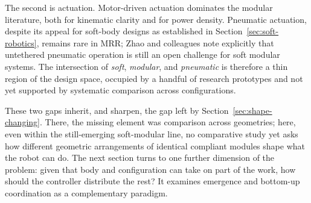 The second is actuation. Motor-driven actuation dominates the modular literature, both for kinematic clarity and for power density. Pneumatic actuation, despite its appeal for soft-body designs as established in Section~\ref{sec:soft-robotics}, remains rare in MRR; Zhao and colleagues note explicitly that untethered pneumatic operation is still an open challenge for soft modular systems. The intersection of \textit{soft}, \textit{modular}, and \textit{pneumatic} is therefore a thin region of the design space, occupied by a handful of research prototypes and not yet supported by systematic comparison across configurations.

These two gaps inherit, and sharpen, the gap left by Section~\ref{sec:shape-changing}. There, the missing element was comparison across geometries; here, even within the still-emerging soft-modular line, no comparative study yet asks how different geometric arrangements of identical compliant modules shape what the robot can do. The next section turns to one further dimension of the problem: given that body and configuration can take on part of the work, how should the controller distribute the rest? It examines emergence and bottom-up coordination as a complementary paradigm.
